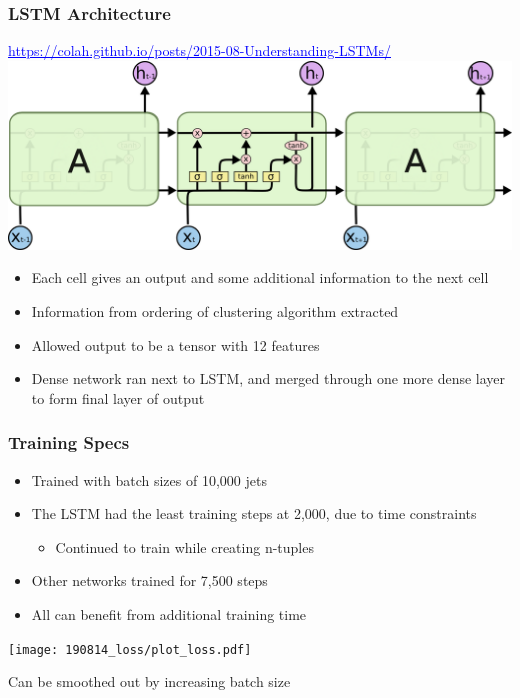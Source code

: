 \documentclass{beamer}
\newcommand{\link}[2]{\href{#2}{\textcolor{blue}{\underline{#1}}}}
\begin{document}
\begin{frame}
  \frametitle{LSTM Architecture}

  \link{https://colah.github.io/posts/2015-08-Understanding-LSTMs/}{https://colah.github.io/posts/2015-08-Understanding-LSTMs/}
  \includegraphics[width=\linewidth]{../../190813/figs/LSTM3-chain.png}

  \begin{itemize}
  \item Each cell gives an output and some additional information to the next cell
  \item Information from ordering of clustering algorithm extracted
  \item Allowed output to be a tensor with 12 features
  \item Dense network ran next to LSTM,
    and merged through one more dense layer
    to form final layer of output
  \end{itemize}

\end{frame}

\begin{frame}
  \frametitle{Training Specs}

  \begin{itemize}
  \item Trained with batch sizes of 10,000 jets
  \item The LSTM had the least training steps at 2,000, due to time constraints
    \begin{itemize}
    \item Continued to train while creating n-tuples
    \end{itemize}
  \item Other networks trained for 7,500 steps
  \item All can benefit from additional training time
  \end{itemize}

  \centering
  \texttt{[image: 190814\_loss/plot\_loss.pdf]}

  Can be smoothed out by increasing batch size

\end{frame}
\end{document}
